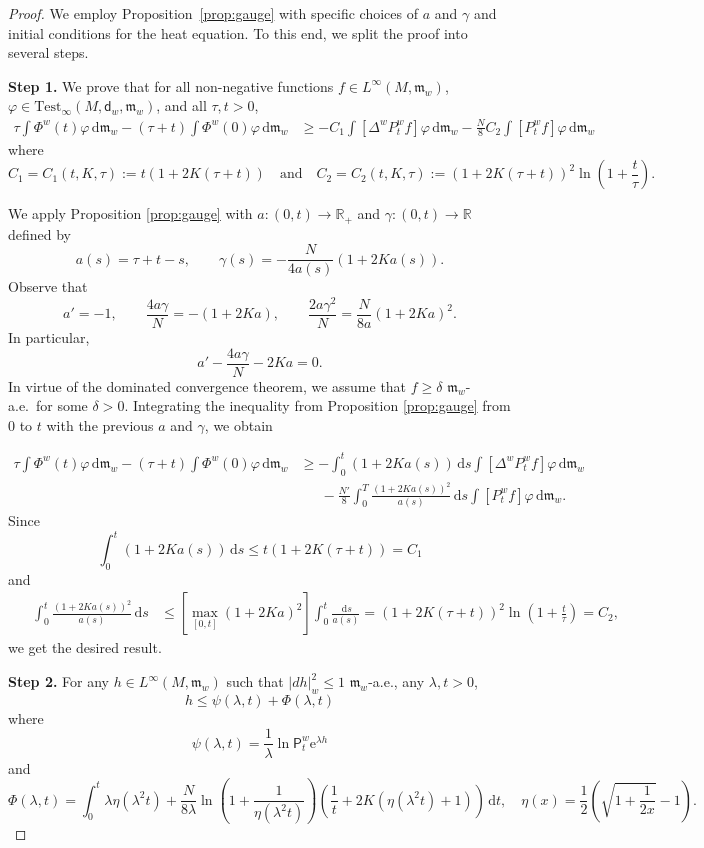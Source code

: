 \documentclass[10pt]{article}
\newcommand{\m}{\mathfrak{m}}
\newcommand{\M}{{\mathit{M}}}
\renewcommand{\d}{\,\mathrm{d}}
\newcommand{\e}{\mathrm{e}}
\renewcommand{\P}{\mathsf{P}}
\newcommand{\dist}{\mathsf{d}}
\theoremstyle{plain}
\theoremstyle{definition}
\begin{document}
\begin{proof}We employ Proposition~\ref{prop:gauge} with specific choices of $a$ and $\gamma$ and initial conditions for the heat equation. To this end, we split the proof into several steps.

\textbf{Step 1.} We prove that for all non-negative functions $f \in L^\infty(\M, \m_w)$, $\varphi \in \mathrm{Test}_\infty(M,\dist_w,\m_w)$, and all $\tau,t>0$,
\begin{align*}
    \tau\int\Phi^w(t)\varphi\d \m_w-(\tau+t)\int\Phi^w(0)\varphi\d \m_w
    & \geq-C_1\int [\Delta^w P_t^wf]\varphi\d\m_w  -\frac{N}{8}C_2\int [P_t^wf]\varphi\d \m_w
    \end{align*}
    where
    \[
    C_1 =  C_1(t,K,\tau):= t(1+2K(\tau+t)) \quad \text{and} \quad C_2 =  C_2(t,K,\tau):= (1+2K(\tau+t))^2\ln\left(1+\frac{t}{\tau}\right).
    \]

We apply Proposition \ref{prop:gauge} with $a : (0,t) \to \mathbb{R}_+$ and $\gamma : (0,t) \to \mathbb{R}$ defined by
    \[
    a(s)=\tau+t-s, \qquad \gamma(s)=-\frac{N}{4a(s)}(1+2Ka(s)).
    \]
    Observe that
    \[
    a'=-1, \qquad \frac{4a\gamma}{N}=-(1+2Ka),\qquad \frac{2a\gamma^2}{N}=\frac{N}{8a}(1+2Ka)^2.
    \]
    In particular,
    \[
    a' - \frac{4a\gamma}{N} - 2 K a = 0.
    \]
    In virtue of the dominated convergence theorem, we assume that $f \ge \delta$ $\m_w$-a.e.~for some $\delta>0$. Integrating the inequality from Proposition \ref{prop:gauge} from $0$ to $t$ with the previous $a$ and $\gamma$, we obtain
    
    \begin{align*}
    \tau\int\Phi^w(t)\varphi\d \m_w-(\tau+t)\int\Phi^w(0)\varphi\d \m_w & 
    \geq -\int_0^t(1+2Ka(s))\d s\int [\Delta^w P_t^wf]\varphi\d\m_w\\
    & \phantom{=} \, -\frac{N'}{8}\int_0^T\frac{(1+2Ka(s))^2}{a(s)}\d s\int [P_t^wf]\varphi\d \m_w.
    \end{align*}
Since
\[
\int_0^t(1+2Ka(s))\d s\leq t(1+2K(\tau+t)) = C_1 \]
and \begin{align*} \phantom{=} \int_0^t\frac{(1+2Ka(s))^2}{a(s)}\d s 
& \leq \left[ \max_{[0,t]}(1+2Ka)^2 \right]\int_0^t\frac{\d s }{a(s)}=(1+2K(\tau+t))^2\ln\left(1+\frac{t}{\tau}\right) = C_2,
\end{align*}
we get the desired result.



\textbf{Step 2.} For any $h\in L^\infty(\M,\m_w)$ such that $|dh|_{w}^2\le 1$ $\m_w$-a.e., any $\lambda,t >0$,
\[
h \le \psi(\lambda,t) + \Phi(\lambda,t)
\]
where
\[
\psi(\lambda,t)=\frac{1}{\lambda}\ln \P_t^w\e^{\lambda h}
\]
and
\[
\Phi(\lambda,t) = \int_0^t \lambda \eta (\lambda^2 t) + \frac{N}{8 \lambda} \ln \left( 1 + \frac{1}{\eta(\lambda^2 t)} \right) \left( \frac{1}{t} + 2 K (\eta(\lambda^2t )+1)\right) \d t, \quad \eta(x) = \frac{1}{2} \left( \sqrt{1 + \frac{1}{2x}}- 1\right).
\]


\end{proof}
\end{document}

